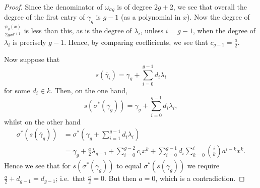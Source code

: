 \documentclass[draft, 11pt]{article} %
\theoremstyle{plain}
\theoremstyle{remark}
\newcommand{\ie}{i.e.\ }
\begin{document}
\begin{proof}
Since the denominator of $\omega_{\sigma g}$ is of degree $2g+2$, we see that overall the degree of the first entry of $\gamma_g$ is $g-1$ (as a polynomial in $x$).
Now the degree of $\frac{\psi_g(x)}{2yx^{g+1}}$ is less than this, as is the degree of $\lambda_i$, unless $i=g-1$, when the degree of $\lambda_i$ is precisely $g-1$.
Hence, by comparing coefficients, we see that $c_{g-1} = \frac{a}{2}$.

Now suppose that 
\[
s(\bar\gamma_i) = \gamma_g + \sum_{i=0}^{g-1}d_i \lambda_i
\]
for some $d_i \in k$.
Then, on the one hand,
\[
s(\sigma^*(\bar\gamma_g)) = \gamma_g + \sum_{i=0}^{g-1}d_i\lambda_i,
\]
whilst on the other hand
\begin{align}
\sigma^*(s(\bar\gamma_g)) & = \sigma^*(\gamma_g + \sum_{i=1}^{g-1} d_i\lambda_i ) \\
& = \gamma_g + \frac{a}{2}\lambda_{g-1} + \sum_{i=0}^{g-2} c_i x^k + \sum_{i=0}^{g-1} d_i \sum_{k=0}^{i} \binom{i}{k}a^{i-k}x^k.
\end{align}
Hence we see that for $s(\sigma^*(\gamma_g))$ to equal $\sigma^*(s(\gamma_g))$ we require $\frac{a}{2} + d_{g-1} = d_{g-1}$; \ie that $\frac{a}{2} = 0$. 
But then $a=0$, which is a contradiction.

\end{proof}
\end{document}
